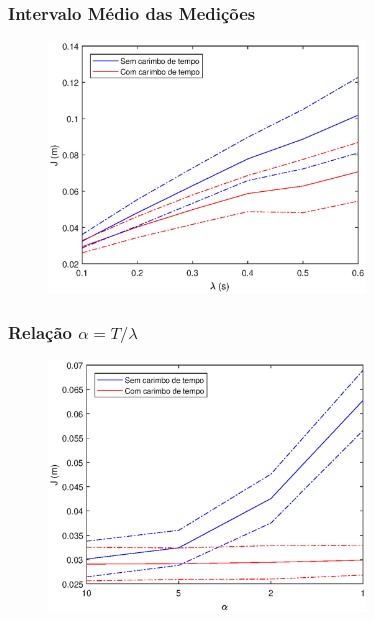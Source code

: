 \documentclass{beamer}
\renewcommand{\(}{\left(}
\renewcommand{\)}{\right)}
\renewcommand{\[}{\left[}
\renewcommand{\]}{\right]}
\begin{document}
\begin{frame}
	\frametitle{Intervalo Médio das Medições}
	
	\begin{figure}
		\centering
		\includegraphics[width=0.75\textwidth]{images/samp.eps}
	\end{figure}

\end{frame}


\begin{frame}
	\frametitle{Relação $\alpha = T/\lambda$}
	
	\begin{figure}
		\centering
		\includegraphics[width=0.75\textwidth]{images/dtudty.eps}
	\end{figure}

\end{frame}

\end{document}

